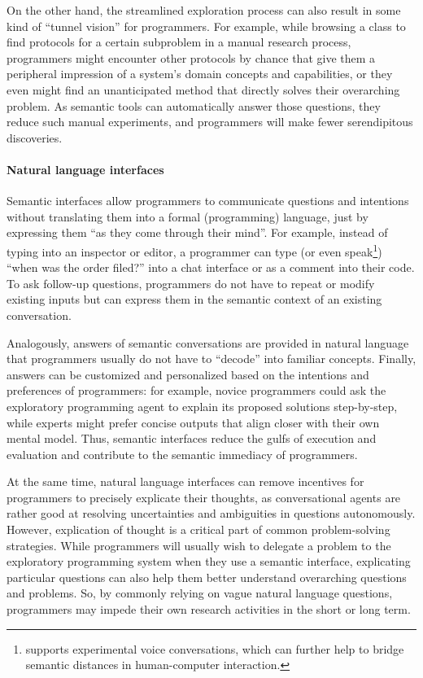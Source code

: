 On the other hand, the streamlined exploration process can also result in some kind of ``tunnel vision'' for programmers.
For example, while browsing a class to find protocols for a certain subproblem in a manual research process, programmers might encounter other protocols by chance that give them a peripheral impression of a system's domain concepts and capabilities, or they even might find an unanticipated method that directly solves their overarching problem.
As semantic tools can automatically answer those questions, they reduce such manual experiments, and programmers will make fewer serendipitous discoveries.

\paragraph{Natural language interfaces}
\label{par:discussion/experience/process/language}

Semantic interfaces allow programmers to communicate questions and intentions without translating them into a formal (programming) language, just by expressing them ``as they come through their mind''.
For example, instead of typing  into an inspector or editor, a programmer can type (or even speak\footnote{\semtex supports experimental voice conversations, which can further help to bridge semantic distances in human-computer interaction.}) ``when was the order filed?'' into a chat interface or as a comment into their code.
To ask follow-up questions, programmers do not have to repeat or modify existing inputs but can express them in the semantic context of an existing conversation.

Analogously, answers of semantic conversations are provided in natural language that programmers usually do not have to ``decode'' into familiar concepts.
Finally, answers can be customized and personalized based on the intentions and preferences of programmers: for example, novice programmers could ask the exploratory programming agent to explain its proposed solutions step-by-step, while experts might prefer concise outputs that align closer with their own mental model.
Thus, semantic interfaces reduce the gulfs of execution and evaluation and contribute to the semantic immediacy of programmers.

At the same time, natural language interfaces can remove incentives for programmers to precisely explicate their thoughts, as conversational agents are rather good at resolving uncertainties and ambiguities in questions autonomously.
However, explication of thought is a critical part of common problem-solving strategies.
While programmers will usually wish to delegate a problem to the exploratory programming system when they use a semantic interface, explicating particular questions can also help them better understand overarching questions and problems.
So, by commonly relying on vague natural language questions, programmers may impede their own research activities in the short or long term.

